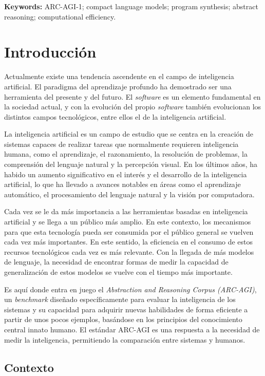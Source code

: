 \documentclass[11pt,a4paper,spanish]{book}
\numberwithin{equation}{chapter}
\numberwithin{figure}{chapter}
\begin{document}
{\bf Keywords:} ARC-AGI-1; compact language models; program synthesis; abstract reasoning; computational efficiency.




\mainmatter
\chapter{Introducción} %

Actualmente existe una tendencia ascendente en el campo de inteligencia artificial. El paradigma del aprendizaje profundo ha demostrado ser una herramienta del presente y del futuro. El \textit{software}
es un elemento fundamental en la sociedad actual, y con la evolución del propio \textit{software} también evolucionan los distintos campos tecnológicos, entre ellos el de la inteligencia artificial.

La inteligencia artificial es un campo de estudio que se centra en la creación de sistemas capaces de realizar tareas que normalmente requieren inteligencia humana, como el aprendizaje,
el razonamiento, la resolución de problemas, la comprensión del lenguaje natural y la percepción visual. En los últimos años, ha habido un aumento significativo en el interés y el
desarrollo de la inteligencia artificial, lo que ha llevado a avances notables en áreas como el aprendizaje automático, el procesamiento del lenguaje natural y la visión por computadora.

Cada vez se le da más importancia a las herramientas basadas en inteligencia artificial y se llega a un público más amplio. En este contexto, los mecanismos para que esta tecnología
pueda ser consumida por el público general se vuelven cada vez más importantes. En este sentido, la eficiencia en el consumo de estos recursos tecnológicos cada vez es más relevante. Con la
llegada de más modelos de lenguaje, la necesidad de encontrar formas de medir la capacidad de generalización de estos modelos se vuelve con el tiempo más importante.

Es aquí donde entra en juego el \textit{Abstraction and Reasoning Corpus (ARC-AGI)}, un \textit{benchmark} diseñado específicamente para evaluar la inteligencia de los sistemas y su capacidad para
adquirir nuevas habilidades de forma eficiente a partir de unos pocos ejemplos, basándose en los principios del conocimiento central innato humano. El estándar ARC-AGI es una respuesta a la necesidad
de medir la inteligencia, permitiendo la comparación entre sistemas y humanos.


\section{Contexto}
\end{document}
